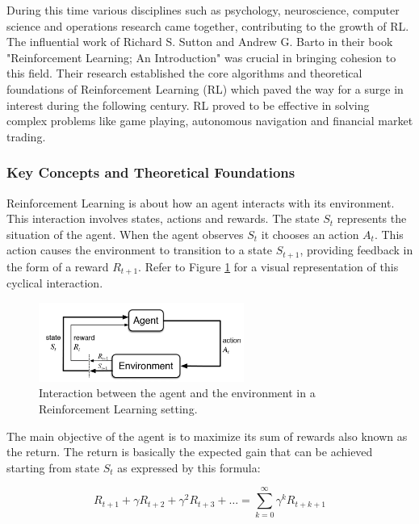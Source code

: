 During this time various disciplines such as psychology, neuroscience, computer science and operations research came together, contributing to the growth of RL. The influential work of Richard S. Sutton and Andrew G. Barto in their book "Reinforcement Learning; An Introduction" was crucial in bringing cohesion to this field.
Their research established the core algorithms and theoretical foundations of Reinforcement Learning (RL) which paved the way for a surge in interest during the following century. RL proved to be effective in solving complex problems like game playing, autonomous navigation and financial market trading.

\subsubsection{Key Concepts and Theoretical Foundations}
Reinforcement Learning is about how an agent interacts with its environment. This interaction involves states, actions and rewards. The state \( S_t \) represents the situation of the agent. When the agent observes \( S_t \) it chooses an action \( A_t \). This action causes the environment to transition to a state \( S_{t+1} \), providing feedback in the form of a reward \( R_{t+1} \). Refer to Figure \ref{Figure:AgentEnvironment} for a visual representation of this cyclical interaction. 

\begin{figure}[htb!]
\centering
\includegraphics[width=0.6\textwidth]{Images/AgentEnvironment.png}
\caption{Interaction between the agent and the environment in a Reinforcement Learning setting.}
\label{Figure:AgentEnvironment}
\end{figure}

The main objective of the agent is to maximize its sum of rewards also known as the return. The return is basically the expected gain that can be achieved starting from state \( S_t \) as expressed by this formula:

\begin{equation}
R_{t+1} + \gamma R_{t+2} + \gamma^2 R_{t+3} + \ldots = \sum_{k=0}^{\infty} \gamma^k R_{t+k+1}
\end{equation}

